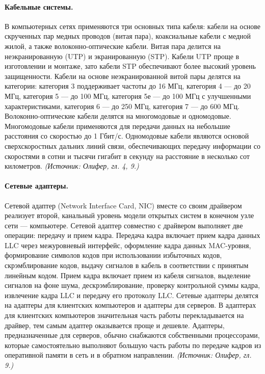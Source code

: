 \documentclass[a4paper,12pt]{article}
\begin{document}
\paragraph{Кабельные системы.}
В компьютерных сетях применяются три основных типа кабеля: кабели на основе скрученных пар медных проводов (витая пара), коаксиальные кабели с медной жилой, а также волоконно-оптические кабели. Витая пара делится на неэкранированную (UTP) и экранированную (STP). Кабели UTP проще в изготовлении и монтаже, зато кабели STP обеспечивают более высокий уровень защищенности. Кабели на основе неэкранированной витой пары делятся на категории: категория 3 поддерживает частоты до 16 МГц, категория 4 — до 20 МГц, категория 5 — до 100 МГц, категория 5е — до 100 МГц с улучшенными характеристиками, категория 6 — до 250 МГц, категория 7 — до 600 МГц. Волоконно-оптические кабели делятся на многомодовые и одномодовые. Многомодовые кабели применяются для передачи данных на небольшие расстояния со скоростью до 1 Гбит/с. Одномодовые кабели являются основой сверхскоростных дальних линий связи, обеспечивающих передачу информации со скоростями в сотни и тысячи гигабит в секунду на расстояние в несколько сот километров.
\textit{(Источник: Олифер, гл. 4, 9.)}

\paragraph{Сетевые адаптеры.}
Сетевой адаптер (Network Interface Card, NIC) вместе со своим драйвером реализует второй, канальный уровень модели открытых систем в конечном узле сети — компьютере. Сетевой адаптер совместно с драйвером выполняет две операции: передачу и прием кадра. Передача кадра включает прием кадра данных LLC через межуровневый интерфейс, оформление кадра данных MAC-уровня, формирование символов кодов при использовании избыточных кодов, скрэмблирование кодов, выдачу сигналов в кабель в соответствии с принятым линейным кодом. Прием кадра включает прием из кабеля сигналов, выделение сигналов на фоне шума, дескрэмблирование, проверку контрольной суммы кадра, извлечение кадра LLC и передачу его протоколу LLC. Сетевые адаптеры делятся на адаптеры для клиентских компьютеров и адаптеры для серверов. В адаптерах для клиентских компьютеров значительная часть работы перекладывается на драйвер, тем самым адаптер оказывается проще и дешевле. Адаптеры, предназначенные для серверов, обычно снабжаются собственными процессорами, которые самостоятельно выполняют большую часть работы по передаче кадров из оперативной памяти в сеть и в обратном направлении.
\textit{(Источник: Олифер, гл. 9.)}
\end{document}
